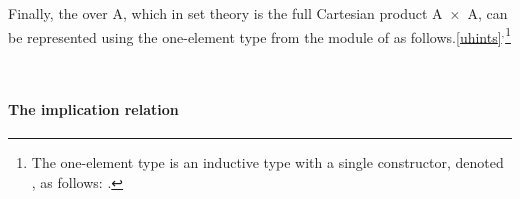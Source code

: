 \ccpad
Finally, the  over \ab A, which in set theory is the full Cartesian product \ab A~\af ×~\ab A, can be represented using the one-element type from the  module of \typtop as follows.\cref{uhints}$^, $\footnote{%
The one-element type is an inductive type with a single constructor, denoted , as follows: \AgdaSpace{}%
\AgdaSpace{}%
\AgdaSymbol{\{}\AgdaSymbol{\}}\AgdaSpace{}%
\AgdaSymbol{:}\AgdaSpace{}%
\AgdaSpace{}%
\AgdaSpace{}%
\AgdaSpace{}\AgdaSpace{}%
\AgdaSymbol{:}\AgdaSpace{}%
.}
\ccpad
\begin{code}%
\>[1]\AgdaSpace{}%
\AgdaSymbol{:}\AgdaSpace{}%
\AgdaSpace{}%
\AgdaSpace{}%
\<%
\\
%
\>[1]\AgdaSpace{}%
\AgdaSpace{}%
\AgdaSpace{}%
\AgdaSymbol{=}\AgdaSpace{}%
\<%
\end{code}


\paragraph*{The implication relation\protect\footnotemark}

